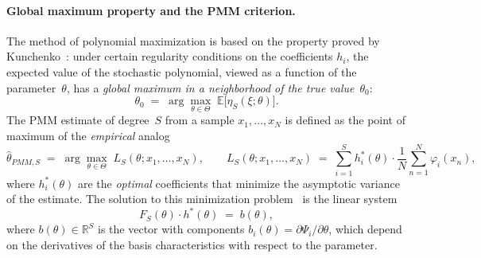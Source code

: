 \documentclass[11pt]{article}
\def\vec#1{#1}%
\def\mathbf#1{#1}%
\def\mathrm#1{#1}%
\theoremstyle{definition}
\newcommand{\E}{\mathbb{E}}
\newcommand{\PMM}{\mathrm{PMM}}
\begin{document}
\paragraph{Global maximum property and the PMM criterion.}
The method of polynomial maximization is based on the property proved by
Kunchenko~\citep[ch.~3.2]{kunchenko2002}: under certain regularity conditions
on the coefficients $h_i$, the expected value of the stochastic polynomial,
viewed as a function of the parameter~$\theta$, has a \emph{global maximum
in a neighborhood of the true value}~$\theta_0$:
\begin{equation}\label{eq:mmpl-property}
  \theta_0
  \;=\; \arg\max_{\theta \in \Theta}\;
        \E\bigl[\eta_S(\xi;\theta)\bigr].
\end{equation}
The PMM estimate of degree~$S$ from a sample $x_1, \ldots, x_N$ is defined
as the point of maximum of the \emph{empirical} analog
\begin{equation}\label{eq:LS-empirical}
  \hat\theta_{\PMM,S}
  \;=\; \arg\max_{\theta \in \Theta}\;
        L_S(\theta; x_1, \ldots, x_N),
  \qquad
  L_S(\theta; x_1, \ldots, x_N)
  \;=\; \sum_{i=1}^{S} h_i^{*}(\theta) \cdot
        \frac{1}{N}\sum_{n=1}^{N} \varphi_i(x_n),
\end{equation}
where $h_i^{*}(\theta)$ are the \emph{optimal} coefficients that minimize
the asymptotic variance of the estimate. The solution to this minimization
problem~\citep[ch.~3.3]{kunchenko2002} is the linear system
\begin{equation}\label{eq:normal-eq}
  \mathbf{F}_S(\theta) \cdot \vec h^{*}(\theta)
  \;=\; \vec b(\theta),
\end{equation}
where $\vec b(\theta) \in \mathbb{R}^{S}$ is the vector with components
$b_i(\theta) = \partial \Psi_i / \partial \theta$, which depend on the
derivatives of the basis characteristics with respect to the parameter.
\end{document}
